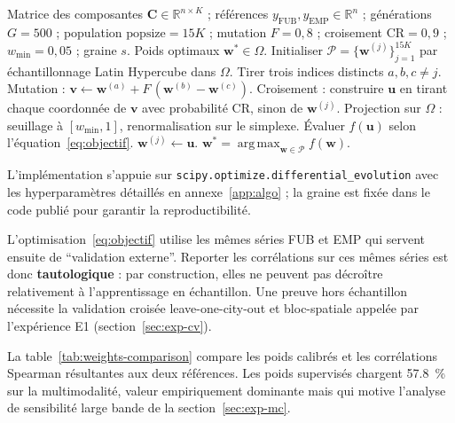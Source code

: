 \documentclass[11pt,a4paper]{article}
\DeclareMathOperator*{\argmax}{arg\,max}
\begin{document}
\begin{algorithm}[H]
\caption{Calibration des poids de l'IMD par évolution
différentielle.}
\label{alg:de}
\begin{algorithmic}[1]
\Require Matrice des composantes
$\mathbf{C}\in\mathbb{R}^{n\times K}$ ; références
$y_{\text{FUB}}, y_{\text{EMP}}\in\mathbb{R}^{n}$ ;
générations $G=500$ ; population $\mathrm{popsize}=15K$ ;
mutation $F=0{,}8$ ; croisement $\mathrm{CR}=0{,}9$ ;
$w_{\min} = 0{,}05$ ; graine $s$.
\Ensure Poids optimaux $\mathbf{w}^{\ast}\in\Omega$.
\State Initialiser $\mathcal{P}=\{\mathbf{w}^{(j)}\}_{j=1}^{15K}$
par échantillonnage Latin Hypercube dans $\Omega$.
        \State Tirer trois indices distincts
        $a, b, c \neq j$.
        \State Mutation :
        $\mathbf{v} \gets \mathbf{w}^{(a)} +
                          F\,(\mathbf{w}^{(b)} - \mathbf{w}^{(c)})$.
        \State Croisement : construire $\mathbf{u}$ en tirant
        chaque coordonnée de $\mathbf{v}$ avec probabilité
        $\mathrm{CR}$, sinon de $\mathbf{w}^{(j)}$.
        \State Projection sur $\Omega$ : seuillage à
        $[w_{\min}, 1]$, renormalisation sur le simplexe.
        \State Évaluer $f(\mathbf{u})$ selon
        l'équation~\eqref{eq:objectif}.
            \State $\mathbf{w}^{(j)} \gets \mathbf{u}$.
        \EndIf
    \EndFor
\EndFor
\State \Return $\mathbf{w}^{\ast} =
\argmax_{\mathbf{w}\in\mathcal{P}} f(\mathbf{w})$.
\end{algorithmic}
\end{algorithm}

L'implémentation s'appuie sur
\texttt{scipy.optimize.differential\_evolution}
\citep{Virtanen2020} avec les hyperparamètres détaillés en
annexe~\ref{app:algo} ; la graine est fixée dans le code publié
pour garantir la reproductibilité.

\begin{limite}
L'optimisation~\eqref{eq:objectif} utilise les mêmes séries FUB
et EMP qui servent ensuite de \enquote{validation externe}.
Reporter les corrélations sur ces mêmes séries est donc
\textbf{tautologique} : par construction, elles ne peuvent pas
décroître relativement à l'apprentissage en échantillon. Une
preuve hors échantillon nécessite la validation croisée
leave-one-city-out et bloc-spatiale appelée par l'expérience E1
(section~\ref{sec:exp-cv}).
\end{limite}

La table~\ref{tab:weights-comparison} compare les poids calibrés
et les corrélations Spearman résultantes aux deux références.
Les poids supervisés chargent \SI{57.8}{\percent} sur la
multimodalité, valeur empiriquement dominante mais qui motive
l'analyse de sensibilité large bande de la
section~\ref{sec:exp-mc}.
\end{document}
